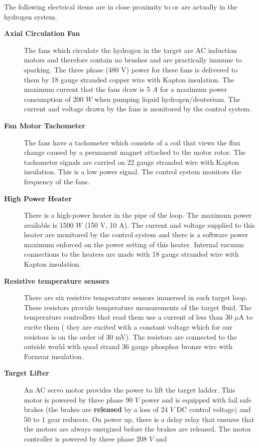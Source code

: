 \begin{safetyen}{0}{0}
{The following electrical items are in close proximity to or are actually
in the hydrogen system.
\begin{description}
\item [{\bf Axial Circulation Fan}] The fans which circulate the
  hydrogen in the target are AC induction motors and therefore contain
  no brushes and are practically immune to sparking. The three phase
  (480 V) power for these fans is delivered to them by 18 gauge
  stranded copper wire with Kapton insulation. The maximum current
  that the fans draw is 5 $A$ for a maximum power consumption of 200
  $W$ when pumping liquid hydrogen/deuterium. The current and voltage
  drawn by the fans is monitored by the control system.
\item [{\bf Fan Motor Tachometer}] The fans have a tachometer which
  consists of a coil that views the flux change caused by a permanent
  magnet attached to the motor rotor. The tachometer signals are
  carried on 22 gauge stranded wire with Kapton insulation. This is a
  low power signal. The control system monitors the frequency of the
  fans.
\item [{\bf High Power Heater}] There is a high-power heater in the
  pipe of the loop. The maximum power available is 1500 $W$ (150 V, 10
  A).  The current and voltage supplied to this heater are monitored
  by the control system and there is a software power maximum enforced
  on the power setting of this heater. Internal vacuum connections to
  the heaters are made with 18 gauge stranded wire with Kapton
  insulation.
\item [{\bf Resistive temperature sensors}] There are six resistive
  temperature sensors immersed in each target loop. These resistors
  provide temperature measurements of the target fluid. The
  temperature controllers that read them use a current of less than 30
  $\mu$A to excite them ( they are excited with a constant voltage
  which for our resistors is on the order of 30 mV). The resistors are
  connected to the outside world with quad strand 36 gauge phosphor
  bronze wire with Formvar insulation.
\item [{\bf Target Lifter}] An AC servo motor provides the power to
  lift the target ladder. This motor is powered by three phase 90 $V$
  power and is equipped with fail safe brakes (the brakes are
  \textbf{released} by a loss of 24 $V$ DC control voltage) and 50 to
  1 gear reducers.  On power up, there is a delay relay that ensures
  that the motors are always energized before the brakes are
  released. The motor controller is powered by three phase 208 $V$ and

\end{description}}
\end{safetyen}
